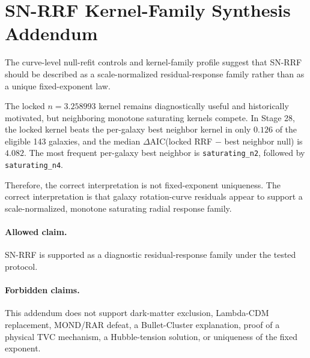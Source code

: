 \section*{SN-RRF Kernel-Family Synthesis Addendum}

The curve-level null-refit controls and kernel-family profile suggest that SN-RRF should be described as a scale-normalized residual-response family rather than as a unique fixed-exponent law.

The locked $n = 3.258993$ kernel remains diagnostically useful and historically motivated, but neighboring monotone saturating kernels compete. In Stage 28, the locked kernel beats the per-galaxy best neighbor kernel in only $0.126$ of the eligible 143 galaxies, and the median $\Delta \mathrm{AIC}$(locked RRF $-$ best neighbor null) is $4.082$. The most frequent per-galaxy best neighbor is \texttt{saturating\_n2}, followed by \texttt{saturating\_n4}.

Therefore, the correct interpretation is not fixed-exponent uniqueness. The correct interpretation is that galaxy rotation-curve residuals appear to support a scale-normalized, monotone saturating radial response family.

\paragraph{Allowed claim.}
SN-RRF is supported as a diagnostic residual-response family under the tested protocol.

\paragraph{Forbidden claims.}
This addendum does not support dark-matter exclusion, Lambda-CDM replacement, MOND/RAR defeat, a Bullet-Cluster explanation, proof of a physical TVC mechanism, a Hubble-tension solution, or uniqueness of the fixed exponent.
